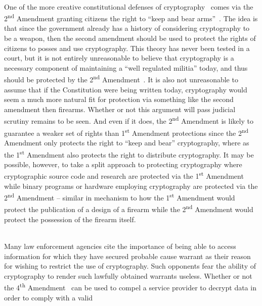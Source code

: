 \begin{packed_desc}
\item[2\textsuperscript{nd} Amendment] \hfill \\ One of the more
  creative constitutional defenses of cryptography~\cite{xkcd-504}
  comes via the 2\textsuperscript{nd} Amendment granting citizens the
  right to ``keep and bear arms''~\cite{us-constitution-amend2}. The
  idea is that since the government already has a history of
  considering cryptography to be a weapon, then the second amendment
  should be used to protect the rights of citizens to posses and use
  cryptography. This theory has never been tested in a court, but it
  is not entirely unreasonable to believe that cryptography is a
  necessary component of maintaining a ``well regulated militia''
  today, and thus should be protected by the 2\textsuperscript{nd}
  Amendment~\cite{scotus-usvmiller-guns}. It is also not unreasonable
  to assume that if the Constitution were being written today,
  cryptography would seem a much more natural fit for protection via
  something like the second amendment then firearms. Whether or not
  this argument will pass judicial scrutiny remains to be seen. And
  even if it does, the 2\textsuperscript{nd} Amendment is likely to
  guarantee a weaker set of rights than 1\textsuperscript{st}
  Amendment protections since the 2\textsuperscript{nd} Amendment only
  protects the right to ``keep and bear'' cryptography, where as the
  1\textsuperscript{st} Amendment also protects the right to
  distribute cryptography. It may be possible, however, to take a
  split approach to protecting cryptography where cryptographic source
  code and research are protected via the 1\textsuperscript{st}
  Amendment while binary programs or hardware employing cryptography
  are protected via the 2\textsuperscript{nd} Amendment -- similar in
  mechanism to how the 1\textsuperscript{st} Amendment would protect
  the publication of a design of a firearm while the
  2\textsuperscript{nd} Amendment would protect the possession of the
  firearm itself.
\item[4\textsuperscript{th} Amendment] \hfill \\ Many law enforcement
  agencies cite the importance of being able to access information for
  which they have secured probable cause warrant as their reason for
  wishing to restrict the use of cryptography. Such opponents fear the
  ability of cryptography to render such lawfully obtained warrants
  useless. Whether or not the 4\textsuperscript{th}
  Amendment~\cite{us-constitution-amend4} can be used to compel a
  service provider to decrypt data in order to comply with a valid

\end{packed_desc}
